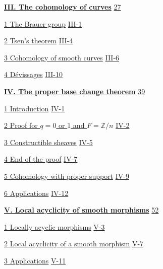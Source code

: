 \documentclass[oneside]{book}
\theoremstyle{sga-source}
\theoremstyle{sga-source-dash}
\theoremstyle{sga-source-dotdash}
\theoremstyle{sga-source-number-note-dash}
\theoremstyle{sga-source-note-number-dotdash}
\theoremstyle{sga-source-example-dotdash}
\theoremstyle{sga-source-inline-number}
\theoremstyle{sga-source-bare-number}
\theoremstyle{sga-source}
\begin{document}
\hyperref[I:3]{\textbf{III. The cohomology of curves}}\dotfill
  \hyperref[I:3]{27}\par
\hspace*{1.5em}\hyperref[I:3-1]{1 The Brauer group}\dotfill
  \hyperref[I:3-1]{III-1}\par
\hspace*{1.5em}\hyperref[I:3-2]{2 Tsen’s theorem}\dotfill
  \hyperref[I:3-2]{III-4}\par
\hspace*{1.5em}\hyperref[I:3-3]{3 Cohomology of smooth curves}\dotfill
  \hyperref[I:3-3]{III-6}\par
\hspace*{1.5em}\hyperref[I:3-4]{4 Dévissages}\dotfill
  \hyperref[I:3-4]{III-10}\par

\hyperref[I:4]{\textbf{IV. The proper base change theorem}}\dotfill
  \hyperref[I:4]{39}\par
\hspace*{1.5em}\hyperref[I:4-1]{1 Introduction}\dotfill
  \hyperref[I:4-1]{IV-1}\par
\hspace*{1.5em}\hyperref[I:4-2]{2 Proof for $q=0$ or $1$ and $F=\mathbb Z/n$}\dotfill
  \hyperref[I:4-2]{IV-2}\par
\hspace*{1.5em}\hyperref[I:4-3]{3 Constructible sheaves}\dotfill
  \hyperref[I:4-3]{IV-5}\par
\hspace*{1.5em}\hyperref[I:4-4]{4 End of the proof}\dotfill
  \hyperref[I:4-4]{IV-7}\par
\hspace*{1.5em}\hyperref[I:4-5]{5 Cohomology with proper support}\dotfill
  \hyperref[I:4-5]{IV-9}\par
\hspace*{1.5em}\hyperref[I:4-6]{6 Applications}\dotfill
  \hyperref[I:4-6]{IV-12}\par

\hyperref[I:5]{\textbf{V. Local acyclicity of smooth morphisms}}\dotfill
  \hyperref[I:5]{52}\par
\hspace*{1.5em}\hyperref[I:5-1]{1 Locally acyclic morphisms}\dotfill
  \hyperref[I:5-1]{V-3}\par
\hspace*{1.5em}\hyperref[I:5-2]{2 Local acyclicity of a smooth morphism}\dotfill
  \hyperref[I:5-2]{V-7}\par
\hspace*{1.5em}\hyperref[I:5-3]{3 Applications}\dotfill
  \hyperref[I:5-3]{V-11}\par
\end{document}
